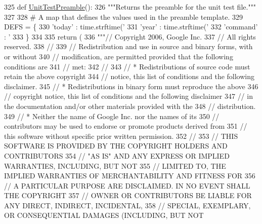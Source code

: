 \begin{DoxyCode}
325 \textcolor{keyword}{def }\hyperlink{namespacegen__gtest__pred__impl_ae52dc86461d1b666c7b658a8c27c69f9}{UnitTestPreamble}():
326   \textcolor{stringliteral}{"""Returns the preamble for the unit test file."""}
327 
328   \textcolor{comment}{# A map that defines the values used in the preamble template.}
329   DEFS = \{
330     \textcolor{stringliteral}{'today'} : time.strftime(\textcolor{stringliteral}{'%
331     \textcolor{stringliteral}{'year'} : time.strftime(\textcolor{stringliteral}{'%
332     \textcolor{stringliteral}{'command'} : \textcolor{stringliteral}{'%
333     \}
334 
335   \textcolor{keywordflow}{return} (
336 \textcolor{stringliteral}{"""// Copyright 2006, Google Inc.}
337 \textcolor{stringliteral}{// All rights reserved.}
338 \textcolor{stringliteral}{//}
339 \textcolor{stringliteral}{// Redistribution and use in source and binary forms, with or without}
340 \textcolor{stringliteral}{// modification, are permitted provided that the following conditions are}
341 \textcolor{stringliteral}{// met:}
342 \textcolor{stringliteral}{//}
343 \textcolor{stringliteral}{//     * Redistributions of source code must retain the above copyright}
344 \textcolor{stringliteral}{// notice, this list of conditions and the following disclaimer.}
345 \textcolor{stringliteral}{//     * Redistributions in binary form must reproduce the above}
346 \textcolor{stringliteral}{// copyright notice, this list of conditions and the following disclaimer}
347 \textcolor{stringliteral}{// in the documentation and/or other materials provided with the}
348 \textcolor{stringliteral}{// distribution.}
349 \textcolor{stringliteral}{//     * Neither the name of Google Inc. nor the names of its}
350 \textcolor{stringliteral}{// contributors may be used to endorse or promote products derived from}
351 \textcolor{stringliteral}{// this software without specific prior written permission.}
352 \textcolor{stringliteral}{//}
353 \textcolor{stringliteral}{// THIS SOFTWARE IS PROVIDED BY THE COPYRIGHT HOLDERS AND CONTRIBUTORS}
354 \textcolor{stringliteral}{// "AS IS" AND ANY EXPRESS OR IMPLIED WARRANTIES, INCLUDING, BUT NOT}
355 \textcolor{stringliteral}{// LIMITED TO, THE IMPLIED WARRANTIES OF MERCHANTABILITY AND FITNESS FOR}
356 \textcolor{stringliteral}{// A PARTICULAR PURPOSE ARE DISCLAIMED. IN NO EVENT SHALL THE COPYRIGHT}
357 \textcolor{stringliteral}{// OWNER OR CONTRIBUTORS BE LIABLE FOR ANY DIRECT, INDIRECT, INCIDENTAL,}
358 \textcolor{stringliteral}{// SPECIAL, EXEMPLARY, OR CONSEQUENTIAL DAMAGES (INCLUDING, BUT NOT}
}}}
\end{DoxyCode}
